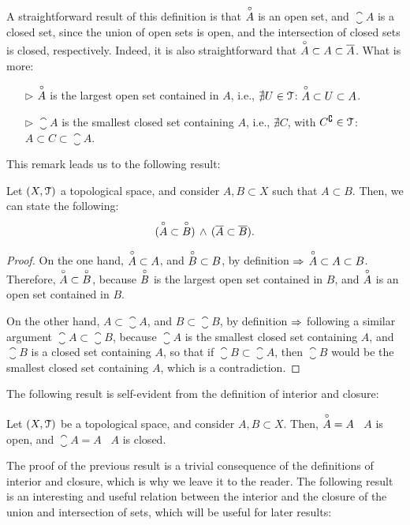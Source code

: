 \begin{remark}
	A straightforward result of this definition is that $\overset{\circ}{A}$ is an open set, and $\closure{A}$ is a closed set, since the union of open sets is open, and the intersection of closed sets is closed, respectively.
	Indeed, it is also straightforward that $\overset{\circ}{A}\subset A\subset \overline{A}$.
	What is more:
	\begin{itemize}
		\item[$\triangleright$] $\overset{\circ}{A}$ is the largest open set contained in $A$, i.e., $\nexists U\in \EuScript{T}$: $\overset{\circ}{A}\subset U\subset A$.
		\item[$\triangleright$] $\closure{A}$ is the smallest closed set containing $A$, i.e., $\nexists C$, with $C^\complement\in \EuScript{T}$: $A\subset C\subset \closure{A}$.
	\end{itemize}
\end{remark}
This remark leads us to the following result:
\begin{lemma}
	\label{lem:interior-closure-subsets}
	Let $(X, \EuScript{T})$ a topological space, and consider $A, B\subset X$ such that $A\subset B$. Then, we can state the following:
	\[
		(\overset{\circ}{A}\subset\overset{\circ}{B})\,\land\,(\overline{A}\subset\overline{B}).
	\]
\end{lemma}
\begin{proof}
	On the one hand, $\overset{\circ}{A}\subset A$, and $\overset{\circ}{B}\subset B$, by definition $\Rightarrow$ $\overset{\circ}{A}\subset A\subset B$. Therefore, $\overset{\circ}{A}\subset\overset{\circ}{B}$, because $\overset{\circ}{B}$ is the largest open set contained in $B$, and $\overset{\circ}{A}$ is an open set contained in $B$.

	On the other hand, $A\subset \closure{A}$, and $B \subset \closure{B}$, by definition $\Rightarrow$ following a similar argument $\closure{A}\subset \closure{B}$, because $\closure{A}$ is the smallest closed set containing $A$, and $\closure{B}$ is a closed set containing $A$, so that if $\closure{B}\subset \closure{A}$, then $\closure{B}$ would be the smallest closed set containing $A$, which is a contradiction.
\end{proof}
The following result is self-evident from the definition of interior and closure:
\begin{lemma}
	\label{lem:interior-open-closure-closed}
	Let $(X, \EuScript{T})$ be a topological space, and consider $A,B\subset X$. Then, $\overset{\circ}{A} = A$ \iff\ $A$ is open, and $\closure{A} = A$ \iff\ $A$ is closed.
\end{lemma}
The proof of the previous result is a trivial consequence of the definitions of interior and closure, which is why we leave it to the reader. The following result is an interesting and useful relation between the interior and the closure of the union and intersection of sets, which will be useful for later results:
